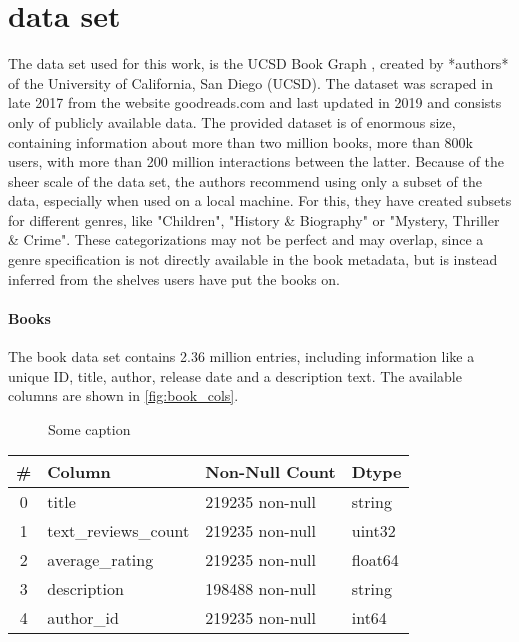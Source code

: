\documentclass[10pt,draft,journal,a4paper,oneside,twocolumn]{IEEEtran}
\begin{document}
\section{data set}
The data set used for this work, is the UCSD Book Graph \cite{todo}, created by *authors* of the University of California, San Diego (UCSD). The dataset was scraped in late 2017 from the website goodreads.com and last updated in 2019 and consists only of publicly available data. The provided dataset is of enormous size, containing information about more than two million books, more than 800k users, with more than 200 million interactions between the latter.
Because of the sheer scale of the data set, the authors recommend using only a subset of the data, especially when used on a local machine. For this, they have created subsets for different genres, like "Children", "History \& Biography" or "Mystery, Thriller \& Crime". These categorizations may not be perfect and may overlap, since a genre specification is not directly available in the book metadata, but is instead inferred from the shelves users have put the books on.
\paragraph{Books}
The book data set contains 2.36 million entries, including information like a unique ID, title, author, release date and a description text.
The available columns are shown in \autoref{fig:book_cols}. 
\begin{figure}[h]
    \centering
    \caption{Some caption}
    \label{fig:book_cols}
\end{figure}

\begin{table}
    
    \begin{tabular}{clll}
        \toprule
    \# & Column & Non-Null Count & Dtype \\
    \midrule
    0 & title & 219235 non-null & string \\
    1 & text\_reviews\_count & 219235 non-null & uint32 \\
    2 & average\_rating & 219235 non-null & float64 \\
    3 & description & 198488 non-null & string \\
    4 & author\_id & 219235 non-null & int64 \\
    \bottomrule
\end{tabular}
\end{table}
    
\end{document}

